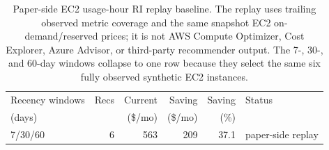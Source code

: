 \begin{table}[t]
\caption{Paper-side EC2 usage-hour RI replay baseline. The replay uses trailing observed metric coverage and the same snapshot EC2 on-demand/reserved prices; it is not AWS Compute Optimizer, Cost Explorer, Azure Advisor, or third-party recommender output. The 7-, 30-, and 60-day windows collapse to one row because they select the same six fully observed synthetic EC2 instances.}
\label{tab:ri-replay}
\centering
\renewcommand{\arraystretch}{1.06}
\begin{tabular}{@{}l r r r r l@{}}
\toprule
Recency windows & Recs & Current & Saving & Saving & Status \\
(days) & & (\$/mo) & (\$/mo) & (\%) & \\
\midrule
7/30/60 & 6 & 563 & 209 & 37.1 & paper-side replay \\
\bottomrule
\end{tabular}
\end{table}
